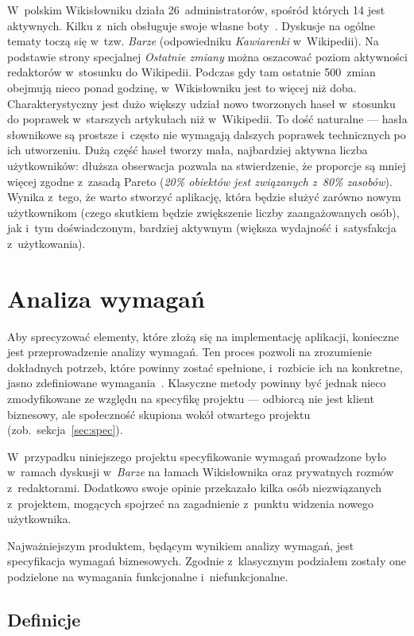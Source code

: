 W~polskim Wikisłowniku działa 26~administratorów, spośród których 14 jest aktywnych. Kilku z~nich obsługuje swoje własne boty~\cite{wikt:admin}. Dyskusje na ogólne tematy toczą się w~tzw. \emph{Barze} (odpowiedniku \emph{Kawiarenki} w~Wikipedii). Na podstawie strony specjalnej \emph{Ostatnie zmiany} można oszacować poziom aktywności redaktorów w~stosunku do Wikipedii. Podczas gdy tam ostatnie 500~zmian obejmują nieco ponad godzinę, w~Wikisłowniku jest to więcej niż doba. Charakterystyczny jest dużo większy udział nowo tworzonych haseł w~stosunku do poprawek w~starszych artykułach niż w~Wikipedii. To dość naturalne --- hasła słownikowe są prostsze i~często nie wymagają dalszych poprawek technicznych po ich utworzeniu. Dużą część haseł tworzy mała, najbardziej aktywna liczba użytkowników: dłuższa obserwacja pozwala na stwierdzenie, że proporcje są mniej więcej zgodne z~zasadą Pareto (\emph{20\% obiektów jest związanych z~80\% zasobów}). Wynika z~tego, że warto stworzyć aplikację, która będzie służyć zarówno nowym użytkownikom (czego skutkiem będzie zwiększenie liczby zaangażowanych osób), jak i~tym doświadczonym, bardziej aktywnym (większa wydajność i~satysfakcja z~użytkowania).


\section{Analiza wymagań}
Aby sprecyzować elementy, które złożą się na implementację aplikacji, konieczne jest przeprowadzenie analizy wymagań. Ten proces pozwoli na zrozumienie dokładnych potrzeb, które powinny zostać spełnione, i~rozbicie ich na konkretne, jasno zdefiniowane wymagania~\cite{guidebook}. Klasyczne metody powinny być jednak nieco zmodyfikowane ze względu na specyfikę projektu --- odbiorcą nie jest klient biznesowy, ale społeczność skupiona wokół otwartego projektu (zob.~sekcja~\ref{sec:spec}).

W~przypadku niniejszego projektu specyfikowanie wymagań prowadzone było w~ramach dyskusji w~\emph{Barze} na łamach Wikisłownika oraz prywatnych rozmów z~redaktorami. Dodatkowo swoje opinie przekazało kilka osób niezwiązanych z~projektem, mogących spojrzeć na zagadnienie z~punktu widzenia nowego użytkownika.

Najważniejszym produktem, będącym wynikiem analizy wymagań, jest specyfikacja wymagań biznesowych. Zgodnie z~klasycznym podziałem zostały one podzielone na wymagania funkcjonalne i~niefunkcjonalne.

\subsection{Definicje}

